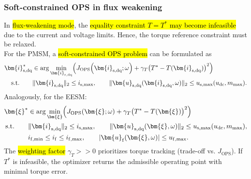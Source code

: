 \begin{frame}
    \frametitle{Soft-constrained OPS in flux weakening}
    In \hl{flux-weakening mode}, the \hl{equality constraint $T=T^*$ may become infeasible} due to
    the current and voltage limits. Hence, the torque reference constraint must be relaxed.\\ \pause%
    For the PMSM, a \hl{soft-constrained OPS problem} can be formulated as
    \begin{equation}
        \begin{aligned}
            \bm{i}_{\mathrm{s,dq}}^*
             & \in
            \arg\min_{\bm{i}_{\mathrm{s,dq}}}
            \Bigl(
            J_{\mathrm{OPS}}\!\left(\bm{i}_{\mathrm{s,dq}};\omega\right)
            +
            \gamma_T \bigl(T^*-T(\bm{i}_{\mathrm{s,dq}})\bigr)^2
            \Bigr)
            \\
            \text{s.t.}\qquad
             & \|\bm{i}_{\mathrm{s,dq}}\|_2\le i_{\mathrm{s},\max},
            \qquad
            \|\bm{u}_{\mathrm{s,dq}}(\bm{i}_{\mathrm{s,dq}},\omega)\|_2
            \le
            u_{\mathrm{s},\max}(u_{\mathrm{dc}},m_{\max}) .
        \end{aligned}
        \label{eq:ops_soft_pmsm}
    \end{equation}\pause%
    Analogously, for the EESM:
    \begin{equation}
        \begin{aligned}
            \bm{\xi}^*
             & \in
            \arg\min_{\bm{\xi}}
            \Bigl(
            J_{\mathrm{OPS}}(\bm{\xi};\omega)
            +
            \gamma_T \bigl(T^*-T(\bm{\xi})\bigr)^2
            \Bigr)
            \\
            \text{s.t.}\qquad
             & \|\bm{i}_{\mathrm{s,dq}}\|_2\le i_{\mathrm{s},\max},
            \qquad
            \|\bm{u}_{\mathrm{s,dq}}(\bm{\xi},\omega)\|_2
            \le
            u_{\mathrm{s},\max}(u_{\mathrm{dc}},m_{\max}),
            \\
             & i_{\mathrm f,\min}\le i_{\mathrm f}\le i_{\mathrm f,\max},
            \qquad
            |\bm{u}_{\mathrm f}(\bm{\xi},\omega)|\le u_{\mathrm f,\max}.
        \end{aligned}
        \label{eq:ops_soft_eesm}
    \end{equation}\pause%
    The \hl{weighting factor} $\gamma_T>>0$ prioritizes torque tracking (trade-off vs. $J_{\mathrm{OPS}}$). If $T^*$ is infeasible,
    the optimizer returns the admissible operating point with minimal torque error.
\end{frame}

